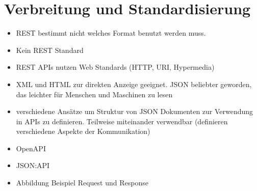 \section{Verbreitung und Standardisierung}
\begin{itemize}
  \item REST bestimmt nicht welches Format benutzt werden muss.
  \item Kein REST Standard
  \item REST APIs nutzen Web Standards (HTTP, URI, Hypermedia)
  \item XML und HTML zur direkten Anzeige geeignet. JSON beliebter geworden, das leichter für Menschen und Maschinen zu lesen
  \item verschiedene Ansätze um Struktur von JSON Dokumenten zur Verwendung in APIs zu definieren. Teilweise miteinander verwendbar (definieren verschiedene Aspekte der Kommunikation)
  \item OpenAPI
  \item JSON:API
  \item Abbildung Beispiel Request und Response
\end{itemize}
